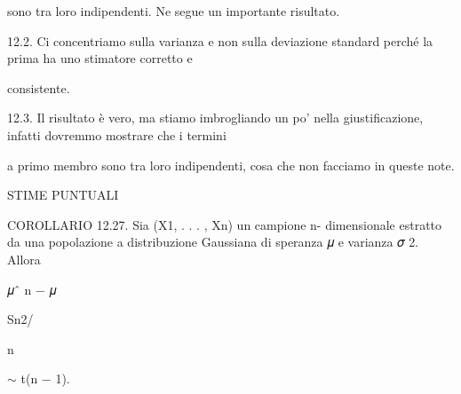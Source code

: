 \documentclass[a4paper,portrait,12pt]{article}
\begin{document}
\begin{flushleft}
sono tra loro indipendenti. Ne segue un importante risultato.
\end{flushleft}


\begin{flushleft}
12.2. Ci concentriamo sulla varianza e non sulla deviazione standard perch\'{e} la prima ha uno stimatore corretto e
\end{flushleft}


\begin{flushleft}
consistente.
\end{flushleft}


\begin{flushleft}
12.3. Il risultato \`{e} vero, ma stiamo imbrogliando un po' nella giustificazione, infatti dovremmo mostrare che i termini
\end{flushleft}


\begin{flushleft}
a primo membro sono tra loro indipendenti, cosa che non facciamo in queste note.
\end{flushleft}










\begin{flushleft}
STIME PUNTUALI
\end{flushleft}





\begin{flushleft}
COROLLARIO 12.27. Sia (X1, . . . , Xn) un campione n- dimensionale estratto da una popolazione a distribuzione Gaussiana di speranza 𝜇 e varianza 𝜎 2. Allora
\end{flushleft}


\begin{flushleft}
𝜇ˆ n $-$ 𝜇
\end{flushleft}


\begin{flushleft}
Sn2/
\end{flushleft}


\begin{flushleft}
n
\end{flushleft}





\begin{flushleft}
$\sim$ t(n $-$ 1).
\end{flushleft}
\end{document}
